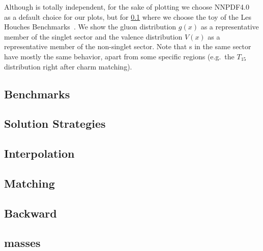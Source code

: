 Although \eko{} is totally \pdf{} independent, for the sake of plotting
we choose NNPDF4.0~\cite{NNPDF:2021njg} as a default choice for
our plots, but for \cref{sec:pheno:bench} where we choose the toy \pdf{} of the
Les Houches Benchmarks~\cite{Giele:2002hx,Dittmar:2005ed}.
We show the gluon distribution $g(x)$ as a
representative member of the singlet sector and the valence distribution $V(x)$
as a representative member of the non-singlet sector.
Note that \pdf{}s in the same sector have mostly the same behavior, apart from
some specific regions (e.g.\ the $T_{15}$ distribution right after charm
matching).

\subsection{Benchmarks}
\label{sec:pheno:bench}


\subsection{Solution Strategies}
\label{sec:pheno:sols}


\subsection{Interpolation}
\label{sec:pheno:interp}


\subsection{Matching}
\label{sec:pheno:match}


\subsection{Backward}
\label{sec:pheno:back}


\subsection{\msbar{} masses}
\label{sec:pheno:msbarmass}

